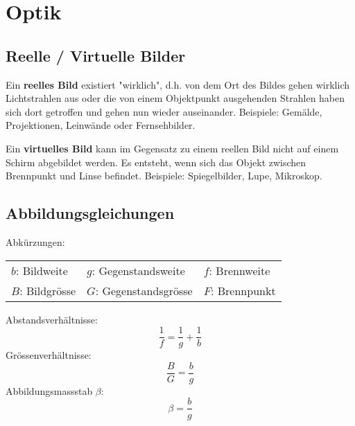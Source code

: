 \section{Optik}

\subsection{Reelle / Virtuelle Bilder}

Ein \textbf{reelles Bild} existiert "wirklich", d.h. von dem Ort des Bildes
gehen wirklich Lichtstrahlen aus oder die von einem Objektpunkt ausgehenden
Strahlen haben sich dort getroffen und gehen nun wieder auseinander. Beispiele:
Gemälde, Projektionen, Leinwände oder Fernsehbilder.

Ein \textbf{virtuelles Bild} kann im Gegensatz zu einem reellen Bild nicht auf
einem Schirm abgebildet werden. Es entsteht, wenn sich das Objekt zwischen
Brennpunkt und Linse befindet. Beispiele: Spiegelbilder, Lupe, Mikroskop.

\subsection{Abbildungsgleichungen}

Abkürzungen:

\begin{tabular}{lll}
	$b$: Bildweite & $g$: Gegenstandsweite & $f$: Brennweite \\
	$B$: Bildgrösse & $G$: Gegenstandsgrösse & $F$: Brennpunkt
\end{tabular}

Abstandsverhältnisse:
\[
	\frac{1}{f} = \frac{1}{g} + \frac{1}{b}
\]
Grössenverhältnisse:
\[
	\frac{B}{G} = \frac{b}{g}
\]
Abbildungsmassstab $\beta$:
\[
	\beta = \frac{b}{g}
\]
